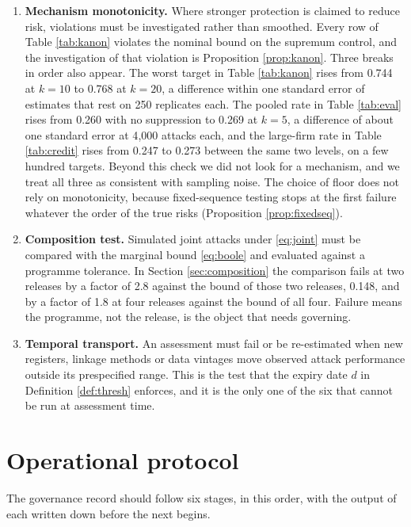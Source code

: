 \documentclass[11pt,a4paper]{article}
\theoremstyle{plain}
\theoremstyle{definition}
\theoremstyle{definition}
\theoremstyle{plain}
\begin{document}
\begin{enumerate}
\item \textbf{Mechanism monotonicity.} Where stronger protection is claimed to
reduce risk, violations must be investigated rather than smoothed. Every row of
Table \ref{tab:kanon} violates the nominal bound on the supremum control, and
the investigation of that violation is Proposition \ref{prop:kanon}. Three breaks
in order also appear. The worst target in Table \ref{tab:kanon} rises from 0.744
at $k = 10$ to 0.768 at $k = 20$, a difference within one standard error of
estimates that rest on 250 replicates each. The pooled rate in Table
\ref{tab:eval} rises from 0.260 with no suppression to 0.269 at $k = 5$, a
difference of about one standard error at 4{,}000 attacks each, and the
large-firm rate in Table \ref{tab:credit} rises from 0.247 to 0.273 between the
same two levels, on a few hundred targets. Beyond this check we
did not look for a mechanism, and we treat all three as consistent with sampling noise. The choice of floor
does not rely on monotonicity, because fixed-sequence testing stops at the first
failure whatever the order of the true risks (Proposition
\ref{prop:fixedseq}).

\item \textbf{Composition test.} Simulated joint attacks under \eqref{eq:joint}
must be compared with the marginal bound \eqref{eq:boole} and evaluated against
a programme tolerance. In Section \ref{sec:composition} the comparison fails at
two releases by a factor of 2.8 against the bound of those two releases, 0.148,
and by a factor of 1.8 at four releases against the bound of all four. Failure means the programme, not the release,
is the object that needs governing.

\item \textbf{Temporal transport.} An assessment must fail or be re-estimated
when new registers, linkage methods or data vintages move observed attack
performance outside its prespecified range. This is the test that the expiry
date $d$ in Definition \ref{def:thresh} enforces, and it is the only one of the
six that cannot be run at assessment time.
\end{enumerate}

\section{Operational protocol}\label{sec:protocol}

The governance record should follow six stages, in this order, with the output
of each written down before the next begins.
\end{document}
